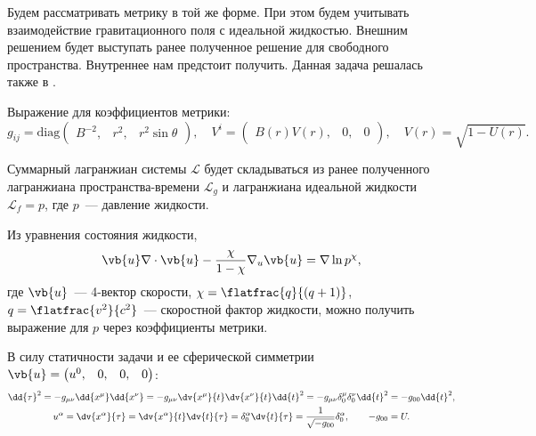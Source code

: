 \documentclass[\docroot/reports/draft/report.tex]{subfiles}
\begin{document}
    Будем рассматривать метрику в той же форме. При этом будем учитывать взаимодействие гравитационного поля с идеальной жидкостью. Внешним решением будет выступать ранее полученное решение для свободного пространства. Внутреннее нам предстоит получить. Данная задача решалась также в \cite{burlankov_new_phys}.

    Выражение для коэффициентов метрики:
    \begin{equation*}
        g_{ij} = \text{diag} \begin{pmatrix}B^{-2}, & r^2, & r^2 \sin\theta\end{pmatrix} , \quad
        V^i = \begin{pmatrix}B(r)V(r), & 0, & 0\end{pmatrix} , \quad
        V(r) = \sqrt{1 - U(r)} .
    \end{equation*}

    Суммарный лагранжиан системы $\mathcal{L}$ будет складываться из ранее полученного лагранжиана пространства-времени $\mathcal{L}_g$ и лагранжиана идеальной жидкости $\mathcal{L}_f = p$, где $p$~--- давление жидкости.

    Из уравнения состояния жидкости,
    \begin{equation*}
        \vb{u} \nabla \cdot \vb{u} - \frac{\chi}{1 - \chi} \nabla_u \vb{u} = \nabla \ln p^{\chi} ,
    \end{equation*}
    где $\vb{u}$~--- 4-вектор скорости, $\chi = \flatfrac{q}{(q+1)}$, $q = \flatfrac{v^2}{c^2}$~--- скоростной фактор жидкости, можно получить выражение для $p$ через коэффициенты метрики.

    В силу статичности задачи и ее сферической симметрии $\vb{u} = \begin{pmatrix}u^0,&0,&0,&0\end{pmatrix}$:
    \begin{gather*}
        \dd{\tau}^2 = - g_{\mu\nu} \dd{x^\mu}\dd{x^\nu} = - g_{\mu\nu} \dv{x^\mu}{t} \dv{x^\nu}{t} \dd{t}^2 = - g_{\mu\nu} \delta^\mu_0 \delta^\nu_0 \dd{t}^2 = - g_{00} \dd{t}^2 , \\
        u^\alpha = \dv{x^\alpha}{\tau} = \dv{x^\alpha}{t} \dv{t}{\tau} = \delta^\alpha_0 \dv{t}{\tau} = \frac{1}{\sqrt{- g_{00}}} \delta^\alpha_0 , \qquad - g_{00} = U .
    \end{gather*}
\end{document}
